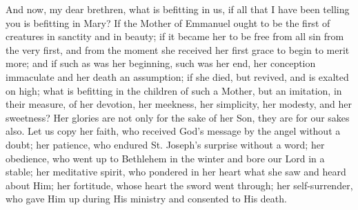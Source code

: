 And now, my dear brethren, what is befitting in us, if all that I
have been telling you is befitting in Mary? If the Mother of Emmanuel
ought to be the first of creatures in sanctity and in beauty; if it
became her to be free from all sin from the very first, and from the
moment she received her first grace to begin to merit more; and if
such as was her beginning, such was her end, her conception immaculate
and her death an assumption; if she died, but revived, and is exalted
on high; what is befitting in the children of such a Mother, but an
imitation, in their measure, of her devotion, her meekness, her
simplicity, her modesty, and her sweetness? Her glories are not only
for the sake of her Son, they are for our sakes also. Let us copy her
faith, who received God's message by the angel without a doubt; her
patience, who endured St. Joseph's surprise without a word; her
obedience, who went up to Bethlehem in the winter and bore our Lord in
a stable; her meditative spirit, who pondered in her heart what she
saw and heard about Him; her fortitude, whose heart the sword went
through; her self-surrender, who gave Him up during His ministry and
consented to His death.

